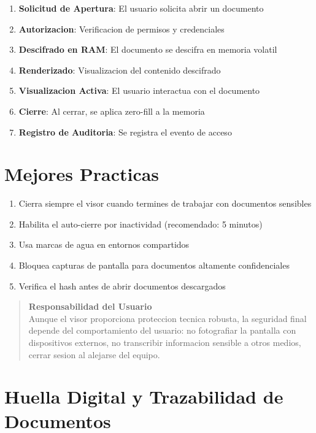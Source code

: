 \begin{enumerate}
    \item \textbf{Solicitud de Apertura}: El usuario solicita abrir un documento
    \item \textbf{Autorizacion}: Verificacion de permisos y credenciales
    \item \textbf{Descifrado en RAM}: El documento se descifra en memoria volatil
    \item \textbf{Renderizado}: Visualizacion del contenido descifrado
    \item \textbf{Visualizacion Activa}: El usuario interactua con el documento
    \item \textbf{Cierre}: Al cerrar, se aplica zero-fill a la memoria
    \item \textbf{Registro de Auditoria}: Se registra el evento de acceso
\end{enumerate}

\section{Mejores Practicas}

\begin{enumerate}[leftmargin=*]
    \item Cierra siempre el visor cuando termines de trabajar con documentos sensibles
    \item Habilita el auto-cierre por inactividad (recomendado: 5 minutos)
    \item Usa marcas de agua en entornos compartidos
    \item Bloquea capturas de pantalla para documentos altamente confidenciales
    \item Verifica el hash antes de abrir documentos descargados
\end{enumerate}

\begin{quote}
\textbf{Responsabilidad del Usuario}\\
Aunque el visor proporciona proteccion tecnica robusta, la seguridad final depende del comportamiento del usuario: no fotografiar la pantalla con dispositivos externos, no transcribir informacion sensible a otros medios, cerrar sesion al alejarse del equipo.
\end{quote}

\section{Huella Digital y Trazabilidad de Documentos}
\label{sec:huella-digital}

